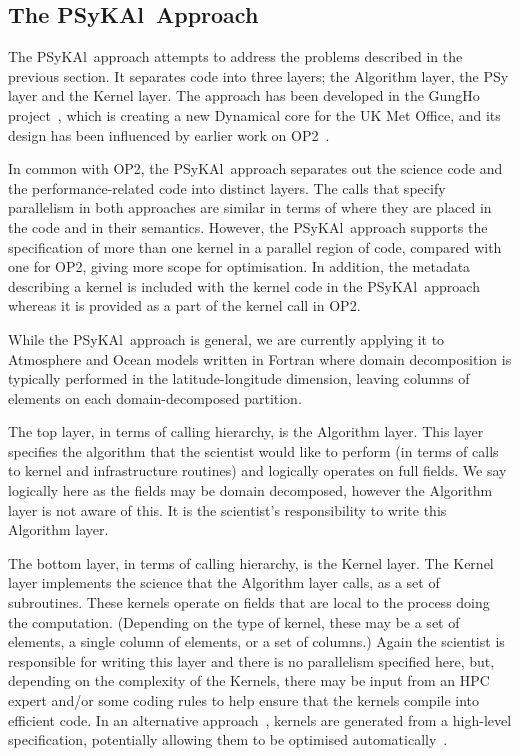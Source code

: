 \documentclass[journal]{IEEEtran}
\newcommand{\psykal}{{PS}y{KA}l}
\begin{document}

\subsection{The \psykal\ Approach}

The \psykal\ approach attempts to address the problems described in
the previous section. It separates code into three layers; the
Algorithm layer, the PSy layer and the Kernel layer. The approach has
been developed in the GungHo project~\cite{GungHo}, which is creating
a new Dynamical core for the UK Met Office, and its design has been
influenced by earlier work on OP2~\cite{OP2, PYOP2}.

In common with OP2, the \psykal\ approach separates out the science
code and the performance-related code into distinct layers. The calls
that specify parallelism in both approaches are similar in terms of
where they are placed in the code and in their semantics. However, the
\psykal\ approach supports the specification of more than one kernel
in a parallel region of code, compared with one for OP2, giving more
scope for optimisation. In addition, the metadata describing a kernel
is included with the kernel code in the \psykal\ approach whereas it
is provided as a part of the kernel call in OP2.

While the \psykal\ approach is general, we are currently applying it to
Atmosphere and Ocean models written in Fortran where domain
decomposition is typically performed in the latitude-longitude
dimension, leaving columns of elements on each domain-decomposed
partition.

The top layer, in terms of calling hierarchy, is the Algorithm
layer. This layer specifies the algorithm that the scientist would like
to perform (in terms of calls to kernel and infrastructure routines)
and logically operates on full fields. We say logically here as the
fields may be domain decomposed, however the Algorithm layer is not
aware of this. It is the scientist's responsibility to write this
Algorithm layer.

The bottom layer, in terms of calling hierarchy, is the Kernel
layer. The Kernel layer implements the science that the Algorithm
layer calls, as a set of subroutines. These kernels operate on fields
that are local to the process doing the computation. (Depending on the
type of kernel, these may be a set of elements, a single column of
elements, or a set of columns.) Again the scientist is responsible for
writing this layer and there is no parallelism specified here, but,
depending on the complexity of the Kernels, there may be input from an
HPC expert and/or some coding rules to help ensure that the kernels
compile into efficient code.  In an alternative
approach~\cite{firedrake,fenics}, kernels are generated from a
high-level specification, potentially allowing them to be optimised
automatically~\cite{coffee}.
\end{document}
